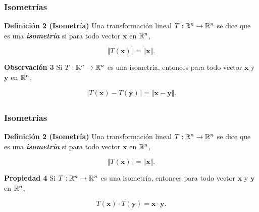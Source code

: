\begin{frame}\frametitle{Isometrías}
			
	\begin{block}{\textbf{Definición 2 (Isometría) }}
		\justifying
		Una transformación lineal $T:\mathbb{R}^n\to \mathbb{R}^n$ se dice que es una \textbf{\textit{isometría}} si para
		todo vector $\mathbf{x}$ en $\mathbb{R}^n$,
		
		\vspace{-4mm}
		\[
		\Vert T(\mathbf{x})\Vert = \Vert \mathbf{x}\Vert.
		\]
	\end{block}
	
	\begin{alertblock}{\textbf{Observación 3}}
		Si  $T:\mathbb{R}^n\to \mathbb{R}^n$ es una isometría, entonces para todo vector 
		$\mathbf{x}$ y $\mathbf{y}$ en $\mathbb{R}^n$,
		
		\vspace{-0mm}
		\[
		\Vert T(\mathbf{x})-T(\mathbf{y})\Vert = \Vert \mathbf{x}-\mathbf{y}\Vert.
		\]
	\end{alertblock}

\end{frame}


\subsection{}

\begin{frame}\frametitle{Isometrías}
	
	\begin{block}{\textbf{Definición 2 (Isometría) }}
		\justifying
		Una transformación lineal $T:\mathbb{R}^n\to \mathbb{R}^n$ se dice que es una \textbf{\textit{isometría}} si para
		todo vector $\mathbf{x}$ en $\mathbb{R}^n$,
		
		\vspace{-4mm}
		\[
		\Vert T(\mathbf{x})\Vert = \Vert \mathbf{x}\Vert.
		\]
	\end{block}	
	
	\begin{prop}{\textbf{Propiedad 4}}			
		\justifying
		Si  $T:\mathbb{R}^n\to \mathbb{R}^n$ es una isometría, entonces para todo vector 
		$\mathbf{x}$ y $\mathbf{y}$ en $\mathbb{R}^n$,
		
		\vspace{-0mm}
		\[
			T(\mathbf{x})\cdot T(\mathbf{y}) = \mathbf{x}\cdot \mathbf{y}.
		\]
	\end{prop}	
	
\end{frame}

